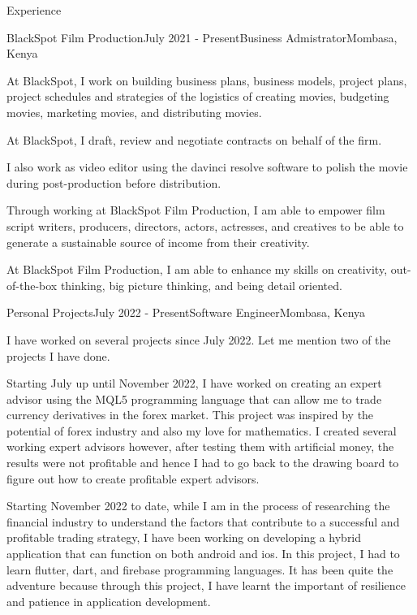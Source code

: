 \documentclass[
	11pt, %
]{resume} %
\begin{document}
\begin{rSection}{Experience}
	\begin{rSubsection}{BlackSpot Film Production}{July 2021 - Present}{Business Admistrator}{Mombasa, Kenya}
		\item At BlackSpot, I work on building business plans, business models, project plans, project schedules and strategies of the logistics of creating movies, budgeting movies, marketing movies, and distributing movies.
		\item At BlackSpot, I draft, review and negotiate contracts on behalf of the firm.
		\item I also work as video editor using the davinci resolve software to polish the movie during post-production before distribution.
		\item Through working at BlackSpot Film Production, I am able to empower film script writers, producers, directors, actors, actresses, and creatives to be able to generate a sustainable source of income from their creativity.
		\item At BlackSpot Film Production, I am able to enhance my skills on creativity, out-of-the-box thinking, big picture thinking, and being detail oriented.
	\end{rSubsection}
	\begin{rSubsection}{Personal Projects}{July 2022 - Present}{Software Engineer}{Mombasa, Kenya}
		\item I have worked on several projects since July 2022. Let me mention two of the projects I have done.
		\item Starting July up until November 2022, I have worked on creating an expert advisor using the MQL5 programming language that can allow me to trade currency derivatives in the forex market. This project was inspired by the potential of forex industry and also my love for mathematics. I created several working expert advisors however, after testing them with artificial money, the results were not profitable and hence I had to go back to the drawing board to figure out how to create profitable expert advisors.
		\item Starting November 2022 to date, while I am in the process of researching the financial industry to understand the factors that contribute to a successful and profitable trading strategy, I have been working on developing a hybrid application that can function on both android and ios. In this project, I had to learn flutter, dart, and firebase programming languages. It has been quite the adventure because through this project, I have learnt the important of resilience and patience in application development.

\end{rSubsection}
\end{rSection}
\end{document}
